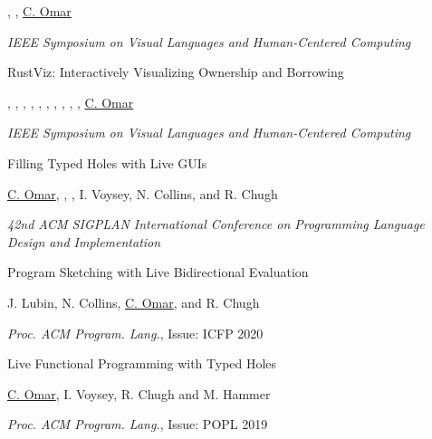 \documentclass[10pt,letterpaper]{article}
\renewenvironment{itemize}{
  \begin{list}{}{
    \setlength{\leftmargin}{1.25em}
    \setlength{\itemsep}{0.25em}
    \setlength{\parskip}{0pt}
    \setlength{\parsep}{0.2em}
  }
}{
  \end{list}
}
\begin{document}
\begin{enumerate}[leftmargin=*, labelindent=6.5em, font=\bfseries]
        \begin{itemize}
          \item {}, , \underline{C. Omar}
          \item \textit{IEEE Symposium on Visual Languages and Human-Centered Computing}
        \end{itemize}      
  \item[VL/HCC 2022] {RustViz: Interactively Visualizing Ownership and Borrowing}
        \begin{itemize}
          \item {}, , , , , , , , , , \underline{C. Omar}
          \item \textit{IEEE Symposium on Visual Languages and Human-Centered Computing}
        \end{itemize}
  \item[PLDI 2021] {Filling Typed Holes with Live GUIs}
        \begin{itemize}
          \item \underline{C. Omar}, , , I. Voysey, N. Collins, and R. Chugh
          \item \textit{42nd ACM SIGPLAN International Conference on Programming Language Design and Implementation}
        \end{itemize}
  \item[ICFP 2020] {Program Sketching with Live Bidirectional Evaluation}
        \begin{itemize}
          \item J. Lubin, N. Collins, \underline{C. Omar}, and R. Chugh
          \item \textit{Proc. ACM Program. Lang.}, Issue: ICFP 2020
        \end{itemize}
  \item[POPL 2019] {Live Functional Programming with Typed Holes}
        \begin{itemize}
          \item \underline{C. Omar}, I. Voysey, R. Chugh and M. Hammer
          \item \textit{Proc. ACM Program. Lang.}, Issue: POPL 2019
        \end{itemize}

\end{enumerate}
\end{document}
